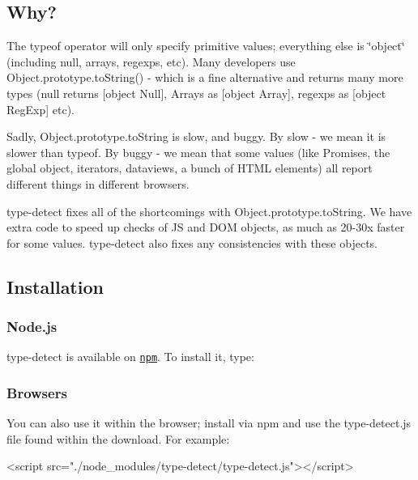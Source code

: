 \subsection*{Why?}

The {\ttfamily typeof} operator will only specify primitive values; everything else is {\ttfamily \char`\"{}object\char`\"{}} (including {\ttfamily null}, arrays, regexps, etc). Many developers use {\ttfamily Object.\+prototype.\+to\+String()} -\/ which is a fine alternative and returns many more types (null returns {\ttfamily \mbox{[}object Null\mbox{]}}, Arrays as {\ttfamily \mbox{[}object Array\mbox{]}}, regexps as {\ttfamily \mbox{[}object Reg\+Exp\mbox{]}} etc).

Sadly, {\ttfamily Object.\+prototype.\+to\+String} is slow, and buggy. By slow -\/ we mean it is slower than {\ttfamily typeof}. By buggy -\/ we mean that some values (like Promises, the global object, iterators, dataviews, a bunch of H\+T\+ML elements) all report different things in different browsers.

{\ttfamily type-\/detect} fixes all of the shortcomings with {\ttfamily Object.\+prototype.\+to\+String}. We have extra code to speed up checks of JS and D\+OM objects, as much as 20-\/30x faster for some values. {\ttfamily type-\/detect} also fixes any consistencies with these objects.

\subsection*{Installation}

\subsubsection*{Node.\+js}

{\ttfamily type-\/detect} is available on \href{http://npmjs.org}{\tt npm}. To install it, type\+: 


\subsubsection*{Browsers}

You can also use it within the browser; install via npm and use the {\ttfamily type-\/detect.\+js} file found within the download. For example\+:


\begin{DoxyCode}
<script src="./node\_modules/type-detect/type-detect.js"></script>
\end{DoxyCode}



